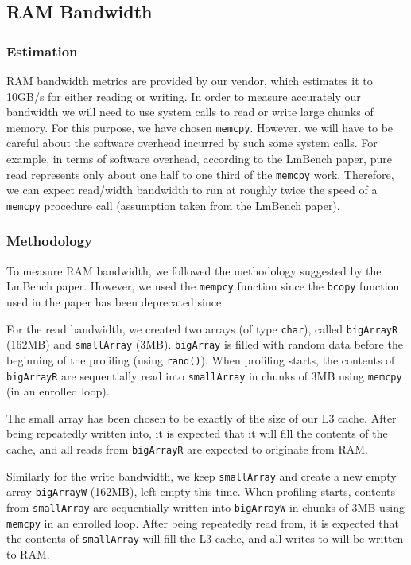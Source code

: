 \subsection{RAM Bandwidth}

\subsubsection{Estimation}

RAM bandwidth metrics are provided by our vendor, which estimates it to 10GB/s for either reading or writing. In order to measure accurately our bandwidth we will need to use system calls to read or write large chunks of memory. For this purpose, we have chosen \texttt{memcpy}. However,  we will have to be careful about the software overhead incurred by such some system calls.
For example, in terms of software overhead, according to the LmBench paper, pure read represents only about one half to one third of the \texttt{memcpy} work. Therefore, we can expect read/width bandwidth to run at roughly twice the speed of a \texttt{memcpy} procedure call (assumption taken from the LmBench paper).

\subsubsection{Methodology}

To measure RAM bandwidth, we followed the methodology suggested by the LmBench paper. However, we used the \texttt{mempcy} function since the \texttt{bcopy} function used in the paper has been deprecated since.

For the read bandwidth, we created two arrays (of type \texttt{char}), called \texttt{bigArrayR} (162MB) and \texttt{smallArray} (3MB). \texttt{bigArray} is filled with random data before the beginning of the profiling (using \texttt{rand()}). When profiling starts, the contents of \texttt{bigArrayR} are sequentially read into \texttt{smallArray} in chunks of 3MB using \texttt{memcpy}  (in an enrolled loop).

The small array has been chosen to be exactly of the size of our L3 cache. After being repeatedly written into, it is expected that it will fill the contents of the cache, and all reads from \texttt{bigArrayR} are expected to originate from RAM.

Similarly for the write bandwidth, we keep \texttt{smallArray} and create a new empty array \texttt{bigArrayW} (162MB), left empty this time. When profiling starts, contents from \texttt{smallArray} are sequentially written into \texttt{bigArrayW} in chunks of 3MB using \texttt{memcpy} in an enrolled loop. After being repeatedly read from, it is expected that the contents of \texttt{smallArray} will fill the L3 cache, and all writes to  will be written to RAM.

